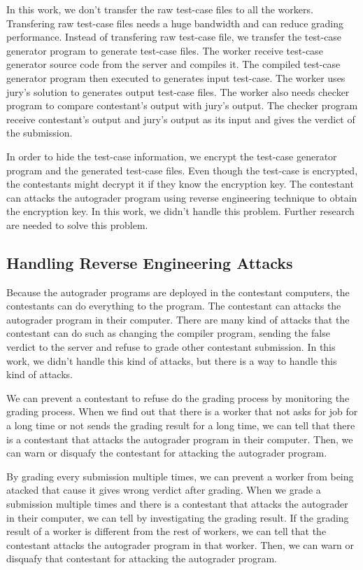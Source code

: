 \documentclass[conference]{IEEEtran}
\begin{document}
In this work, we don't transfer the raw test-case files to all the workers. Transfering raw test-case files needs a huge bandwidth and can reduce grading performance. Instead of transfering raw test-case file, we transfer the test-case generator program to generate test-case files. The worker receive test-case generator source code from the server and compiles it. The compiled test-case generator program then executed to generates input test-case. The worker uses jury's solution to generates output test-case files. The worker also needs checker program to compare contestant's output with jury's output. The checker program receive contestant's output and jury's output as its input and gives the verdict of the submission.

In order to hide the test-case information, we encrypt the test-case generator program and the generated test-case files. Even though the test-case is encrypted, the contestants might decrypt it if they know the encryption key. The contestant can attacks the autograder program using reverse engineering technique to obtain the encryption key. In this work, we didn't handle this problem. Further research are needed to solve this problem.

\subsection{Handling Reverse Engineering Attacks}

Because the autograder programs are deployed in the contestant computers, the contestants can do everything to the program. The contestant can attacks the autograder program in their computer. There are many kind of attacks that the contestant can do such as changing the compiler program, sending the false verdict to the server and refuse to grade other contestant submission. In this work, we didn't handle this kind of attacks, but there is a way to handle this kind of attacks.

We can prevent a contestant to refuse do the grading process by monitoring the grading process. When we find out that there is a worker that not asks for job for a long time or not sends the grading result for a long time, we can tell that there is a contestant that attacks the autograder program in their computer. Then, we can warn or disquafy the contestant for attacking the autograder program.

By grading every submission multiple times, we can prevent a worker from being atacked that cause it gives wrong verdict after grading. When we grade a submission multiple times and there is a contestant that attacks the autograder in their computer, we can tell by investigating the grading result. If the grading result of a worker is different from the rest of workers, we can tell that the contestant attacks the autograder program in that worker. Then, we can warn or disquafy that contestant for attacking the autograder program.
\end{document}

